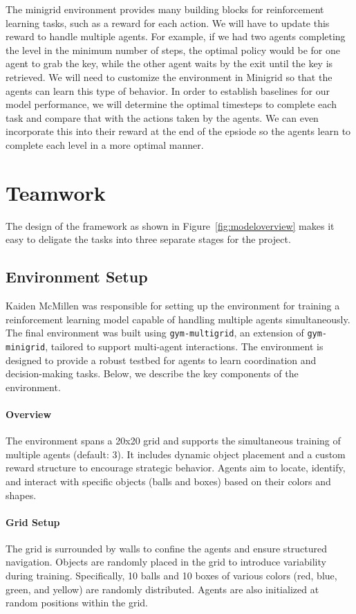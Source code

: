 \documentclass[11pt]{article}
\begin{document}
The minigrid environment provides many building blocks for reinforcement learning tasks, such as a reward for each action. We will have to update this reward to handle multiple agents. For example, if we had two agents completing the level in the minimum number of steps, the optimal policy would be for one agent to grab the key, while the other agent waits by the exit until the key is retrieved. We will need to customize the environment in Minigrid so that the agents can learn this type of behavior. In order to establish baselines for our model performance, we will determine the optimal timesteps to complete each task and compare that with the actions taken by the agents. We can even incorporate this into their reward at the end of the epsiode so the agents learn to complete each level in a more optimal manner.



\section{Teamwork}

The design of the framework as shown in Figure~\ref{fig:modeloverview} makes it easy to deligate the tasks into three separate stages for the project. 

\subsection{Environment Setup}
Kaiden McMillen was responsible for setting up the environment for training a reinforcement learning model capable of handling multiple agents simultaneously. The final environment was built using \texttt{gym-multigrid}, an extension of \texttt{gym-minigrid}, tailored to support multi-agent interactions. The environment is designed to provide a robust testbed for agents to learn coordination and decision-making tasks. Below, we describe the key components of the environment.

\paragraph{Overview} 
The environment spans a 20x20 grid and supports the simultaneous training of multiple agents (default: 3). It includes dynamic object placement and a custom reward structure to encourage strategic behavior. Agents aim to locate, identify, and interact with specific objects (balls and boxes) based on their colors and shapes.

\paragraph{Grid Setup} 
The grid is surrounded by walls to confine the agents and ensure structured navigation. Objects are randomly placed in the grid to introduce variability during training. Specifically, 10 balls and 10 boxes of various colors (red, blue, green, and yellow) are randomly distributed. Agents are also initialized at random positions within the grid.
\end{document}
